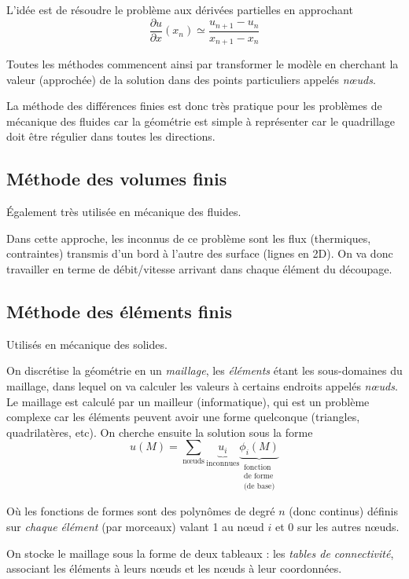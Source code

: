 \documentclass{article}
\begin{document}
L'idée est de résoudre le problème aux dérivées partielles en approchant 
\[\dfrac{\partial u}{\partial x} (x_n) \simeq \dfrac{u_{n+1} - u_n}{x_{n+1}-x_n}
\]

Toutes les méthodes commencent ainsi par transformer le modèle en cherchant la valeur (approchée) de la solution dans des points particuliers appelés \emph{nœuds}. 
\bigskip

La méthode des différences finies est donc très pratique pour les problèmes de mécanique des fluides car la géométrie est simple à représenter car le quadrillage doit être régulier dans toutes les directions.

\subsection{Méthode des volumes finis}
Également très utilisée en mécanique des fluides.

Dans cette approche, les inconnus de ce problème sont les flux (thermiques, contraintes) transmis d'un bord à l'autre des surface (lignes en 2D). On va donc travailler en terme de débit/vitesse arrivant dans chaque élément du découpage.


\subsection{Méthode des éléments finis}
Utilisés en mécanique des solides.

On discrétise la géométrie en un \emph{maillage}, les \emph{éléments} étant les sous-domaines du maillage, dans lequel on va calculer les valeurs à certains endroits appelés \emph{nœuds}. Le maillage est calculé par un mailleur (informatique), qui est un problème complexe car les éléments peuvent avoir une forme quelconque (triangles, quadrilatères, etc). On cherche ensuite la solution sous la forme
\[u(M) = \sum_{\text{nœuds}} \underbrace{u_i}_{\text{inconnues}} \underbrace{\phi_i (M)}_{\substack{\text{fonction}\\\text{de forme}\\\text{(de base)}}}\]

Où les fonctions de formes sont des polynômes de degré $n$ (donc continus) définis sur \emph{chaque élément} (par morceaux) valant 1 au nœud $i$ et 0 sur les autres nœuds.

On stocke le maillage sous la forme de deux tableaux : les \emph{tables de connectivité}, associant les éléments à leurs nœuds et les nœuds à leur coordonnées.
\bigskip
\end{document}
